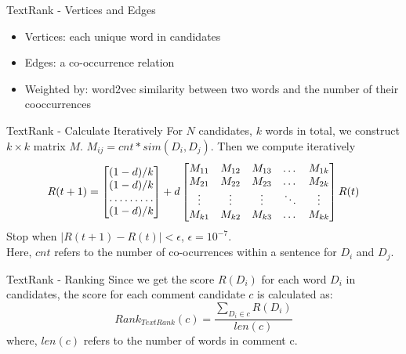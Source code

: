 \documentclass[aspectratio=169]{beamer} %
\begin{document}
    \begin{frame}{TextRank - Vertices and Edges}
      \begin{itemize}
        \item Vertices: each unique word in candidates
        \item Edges: a co-occurrence relation
        \item Weighted by: word2vec similarity between two words and the number of their cooccurrences
      \end{itemize}
    \end{frame}

    \begin{frame}{TextRank - Calculate Iteratively}
      For $N$ candidates, $k$ words in total, we construct $ k \times k $ 
      matrix $M$. $M_{ij} = cnt * sim(D_i, D_j)$. Then we compute iteratively
      \[
      R(t+1) = 
      \begin{bmatrix}
          (1-d)/k       \\
          (1-d)/k       \\
          \hdotsfor{1} \\
          (1-d)/k       
      \end{bmatrix}
      +d
      \begin{bmatrix}
          M_{11} & M_{12} & M_{13} & \dots  & M_{1k} \\
          M_{21} & M_{22} & M_{23} & \dots  & M_{2k} \\
          \vdots & \vdots & \vdots & \ddots & \vdots \\
          M_{k1} & M_{k2} & M_{k3} & \dots  & M_{kk}
      \end{bmatrix}
      R(t)
      \]
      Stop when $|R(t+1)-R(t)|<\epsilon$, $\epsilon = 10^{-7}$. \\
      Here, $cnt$ refers to the number of co-ocurrences within a sentence for $D_i$ and $D_j$. \\
    \end{frame}

    \begin{frame}{TextRank - Ranking}
      Since we get the score $R(D_i)$ for each word $D_i$ in candidates, the 
      score for each comment candidate $c$ is calculated as:
      \begin{equation}
        Rank_{TextRank}(c) = \frac{\sum_{D_i \in c}{R(D_i)}}{len(c)} 
      \end{equation}
      where, $len(c)$ refers to the number of words in comment c.
    \end{frame}
\end{document}
